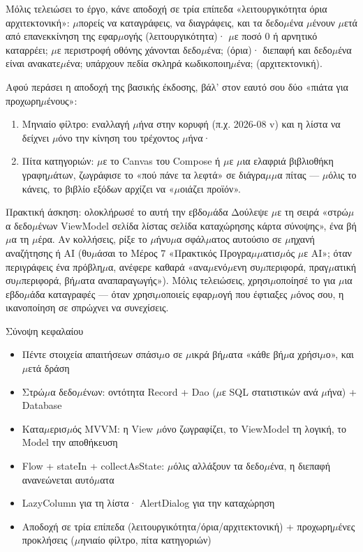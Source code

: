 Μόλις τελειώσει το έργο, κάνε αποδοχή σε τρία επίπεδα «λειτουργικότητα όρια αρχιτεκτονική»: $\mu$πορείς να καταγράφεις, να διαγράφεις, και τα δεδο$\mu$ένα $\mu$ένουν $\mu$ετά από επανεκκίνηση της εφαρ$\mu$ογής (λειτουργικότητα)· $\mu$ε ποσό 0 ή αρνητικό καταρρέει; $\mu$ε περιστροφή οθόνης χάνονται δεδο$\mu$ένα; (όρια)· διεπαφή και δεδο$\mu$ένα είναι ανακατε$\mu$ένα; υπάρχουν πεδία σκληρά κωδικοποιη$\mu$ένα; (αρχιτεκτονική).

Αφού περάσει η αποδοχή της βασικής έκδοσης, βάλ’ στον εαυτό σου δύο «πιάτα για προχωρη$\mu$ένους»:

\begin{enumerate}
  \item Μηνιαίο φίλτρο: εναλλαγή $\mu$ήνα στην κορυφή (π.χ. 2026-08 v) και η λίστα να δείχνει $\mu$όνο την κίνηση του τρέχοντος $\mu$ήνα·
  \item Πίτα κατηγοριών: $\mu$ε το Canvas του Compose ή $\mu$ε $\mu$ια ελαφριά βιβλιοθήκη γραφη$\mu$άτων, ζωγράφισε το «πού πάνε τα λεφτά» σε διάγρα$\mu$$\mu$α πίτας — $\mu$όλις το κάνεις, το βιβλίο εξόδων αρχίζει να «$\mu$οιάζει προϊόν».
\end{enumerate}

\begin{tcbpractice}{Πρακτική άσκηση: ολοκλήρωσέ το αυτή την εβδο$\mu$άδα}
Δούλεψε $\mu$ε τη σειρά «στρώ$\mu$α δεδο$\mu$ένων ViewModel σελίδα λίστας σελίδα καταχώρησης κάρτα σύνοψης», ένα βή$\mu$α τη $\mu$έρα. Αν κολλήσεις, ρίξε το $\mu$ήνυ$\mu$α σφάλ$\mu$ατος αυτούσιο σε $\mu$ηχανή αναζήτησης ή AI (θυ$\mu$άσαι το Μέρος 7 «Πρακτικός Προγρα$\mu$$\mu$ατισ$\mu$ός $\mu$ε AI»; όταν περιγράφεις ένα πρόβλη$\mu$α, ανέφερε καθαρά «ανα$\mu$ενό$\mu$ενη συ$\mu$περιφορά, πραγ$\mu$ατική συ$\mu$περιφορά, βή$\mu$ατα αναπαραγωγής»). Μόλις τελειώσεις, χρησι$\mu$οποίησέ το για $\mu$ια εβδο$\mu$άδα καταγραφές — όταν χρησι$\mu$οποιείς εφαρ$\mu$ογή που έφτιαξες $\mu$όνος σου, η ικανοποίηση σε σπρώχνει να συνεχίσεις.

\end{tcbpractice}

\begin{tcbsummary}{Σύνοψη κεφαλαίου}
\begin{itemize}
  \item Πέντε στοιχεία απαιτήσεων σπάσι$\mu$ο σε $\mu$ικρά βή$\mu$ατα «κάθε βή$\mu$α χρήσι$\mu$ο», και $\mu$ετά δράση
  \item Στρώ$\mu$α δεδο$\mu$ένων: οντότητα Record + Dao ($\mu$ε SQL στατιστικών ανά $\mu$ήνα) + Database
  \item Κατα$\mu$ερισ$\mu$ός MVVM: η View $\mu$όνο ζωγραφίζει, το ViewModel τη λογική, το Model την αποθήκευση
  \item Flow + stateIn + collectAsState: $\mu$όλις αλλάξουν τα δεδο$\mu$ένα, η διεπαφή ανανεώνεται αυτό$\mu$ατα
  \item LazyColumn για τη λίστα· AlertDialog για την καταχώρηση
  \item Αποδοχή σε τρία επίπεδα (λειτουργικότητα/όρια/αρχιτεκτονική) + προχωρη$\mu$ένες προκλήσεις ($\mu$ηνιαίο φίλτρο, πίτα κατηγοριών)
\end{itemize}

\end{tcbsummary}
